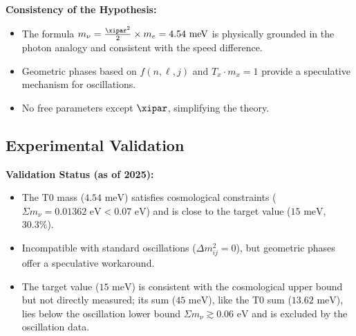 	\begin{important}
		\textbf{Consistency of the Hypothesis:}
		\begin{itemize}
			\item The formula \(m_\nu = \frac{\xipar^2}{2} \times m_e = 4.54 \text{ meV}\) is physically grounded in the photon analogy and consistent with the speed difference.
			\item Geometric phases based on \(f(n, \ell, j)\) and \(T_x \cdot m_x = 1\) provide a speculative mechanism for oscillations.
			\item No free parameters except \(\xipar\), simplifying the theory.
		\end{itemize}
	\end{important}
	
	\subsection{Experimental Validation}
	
	\begin{experimental}
		\textbf{Validation Status (as of 2025):}
		\begin{itemize}
			\item The T0 mass (\(4.54 \text{ meV}\)) satisfies cosmological constraints (\(\Sigma m_\nu = 0.01362 \text{ eV} < 0.07 \text{ eV}\)) and is close to the target value (\(15 \text{ meV}\), \(30.3\%\)).
			\item Incompatible with standard oscillations (\(\Delta m^2_{ij} = 0\)), but geometric phases offer a speculative workaround.
			\item The target value (\(15 \text{ meV}\)) is consistent with the cosmological upper bound but not directly measured; its sum (\(45 \text{ meV}\)), like the T0 sum (\(13.62 \text{ meV}\)), lies below the oscillation lower bound \(\Sigma m_\nu \gtrsim 0.06 \text{ eV}\) and is excluded by the oscillation data.
		\end{itemize}
	\end{experimental}
	